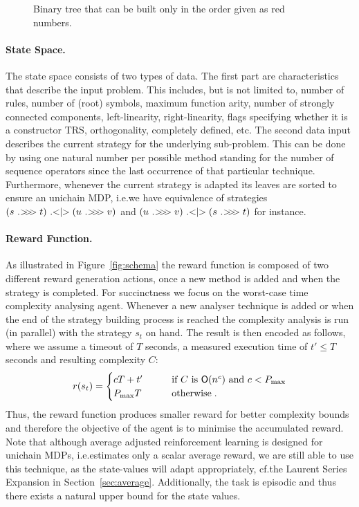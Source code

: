 \documentclass[envcountsame]{llncs}
\begin{document}
\begin{figure*}[t!]
  \centering
  \caption{\label{fig:binary}Binary tree that can be built only in the order given as red numbers.}
\end{figure*}

\paragraph{State Space.} The state space consists of two types of data. The first part are
characteristics that describe the input problem. This includes, but is not limited to, number of
rules, number of (root) symbols, maximum function arity, number of strongly connected components,
left-linearity, right-linearity, flags specifying whether it is a constructor TRS, orthogonality,
completely defined, etc. The second data input describes the current strategy for the underlying
sub-problem. This can be done by using one natural number per possible method standing for the
number of sequence operators since the last occurrence of that particular technique. Furthermore,
whenever the current strategy is adapted its leaves are sorted to ensure an unichain MDP, i.e.\@ we
have equivalence of strategies \((s \seq t) \alt (u \seq v)\) and \((u \seq v) \alt (s \seq t)\) for
instance.


\paragraph{Reward Function.} As illustrated in Figure~\ref{fig:schema} the reward function is
composed of two different reward generation actions, once a new method is added and when the
strategy is completed. %
For succinctness we focus on the worst-case time complexity analysing agent. Whenever a new analyser
technique is added or when the end of the strategy building process is reached the complexity
analysis is run (in parallel) with the strategy \(s_{t}\) on hand. The result is then encoded as
follows, where we assume a timeout of \(T\) seconds, a measured execution time of \(t' \leqslant T\)
seconds and resulting complexity \(C\):
\begin{align*}
  r(s_{t}) =
  \begin{cases}
     c T + t'    & \qquad   \text{if $C$ is }\bO(n^{c}) \text{ and } c < P_{\max}\\
     P_{\max} T  & \qquad  \text{otherwise}\tpkt
  \end{cases}
\end{align*}
Thus, the reward function produces smaller reward for better complexity bounds and therefore the
objective of the agent is to minimise the accumulated reward. Note that although average adjusted
reinforcement learning is designed for unichain MDPs, i.e.\@ estimates only a scalar average reward,
we are still able to use this technique, as the state-values will adapt appropriately, cf.\@ the
Laurent Series Expansion in Section~\ref{sec:average}. Additionally, the task is episodic and thus
there exists a natural upper bound for the state values.
\end{document}
